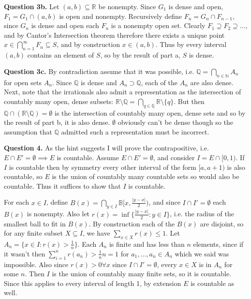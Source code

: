 \documentclass[letterpaper, reqno,11pt]{article}
\begin{document}
{\medskip\noindent\bf Question 3b.} Let $(a,b)\subseteq \mathbb{R}$ be nonempty. Since $G_1$ is dense and open, $F_1=G_1\cap (a,b)$ is open and nonempty. Recursively define $F_n=G_n\cap F_{n-1}$, since $G_n$ is dense and open each $F_n$ is a nonempty open set. Clearly $F_1\supseteq F_2\supseteq\ldots$, and by Cantor's Intersection theorem therefore there exists a unique point $x\in\bigcap_{n=1}^{\infty}F_n\subseteq S$, and by construction $x\in (a,b)$. Thus by every interval $(a,b)$ contains an element of $S$, so by the result of part a, $S$ is dense.

{\medskip\noindent\bf Question 3c.} By contradiction assume that it was possible, i.e. $\mathbb{Q}=\bigcap_{n\in \mathbb{N}}A_n$ for open sets $A_n$. Since $\mathbb{Q}$ is dense and $A_n\supset \mathbb{Q}$, each of the $A_n$ are also dense. Next, note that the irrationals also admit a representation as the intersection of countably many open, dense subsets: $\mathbb{R}\setminus \mathbb{Q}=\bigcap_{q\in \mathbb{Q}}\mathbb{R}\setminus \{q\}$. But then $\mathbb{Q}\cap (\mathbb{R}\setminus \mathbb{Q})=\emptyset$ is the intersection of countably many open, dense sets and so by the result of part b, it is also dense. $\emptyset$ obviously can't be dense though so the assumption that $\mathbb{Q}$ admitted such a representation must be incorrect.

\newpage\phantom{blabla}
\newpage

{\medskip\noindent\bf Question 4.} As the hint suggests I will prove the contrapositive, i.e. $E\cap E'=\emptyset\implies E$ is countable. Assume $E\cap E'=\emptyset$, and consider $I=E\cap [0,1)$. If $I$ is countable then by symmetry every other interval of the form $[a,a+1)$ is also countable, so $E$ is the union of countably many countable sets so would also be countable. Thus it suffices to show that $I$ is countable.

For each $x\in I$, define $B(x)=\bigcap_{y\in I}\mathbb B[x,\frac{|y-x|}{2})$, and since $I\cap I'=\emptyset$ each $B(x)$ is nonempty. Also let $r(x)=\inf \{\frac{|y-x|}{2}: y\in I\}$, i.e. the radius of the smallest ball to fit in $B(x)$. By construction each of the $B(x)$ are disjoint, so for any finite subset $X\subseteq I$, we have $\sum_{x\in X}r(x)\leq 1$. Let $A_n=\{x\in I: r(x)>\frac{1}{n}\}$. Each $A_n$ is finite and has less than $n$ elements, since if it wasn't then $\sum_{i=1}^{n}r(a_n)>\frac{1}{n}n=1$ for $a_1,\ldots,a_n\in A_n$ which we said was impossible. Also since $r(x)>0\forall x$ since $I\cap I'=\emptyset$, every $x\in X$ is in $A_n$ for some $n$. Then $I$ is the union of countably many finite sets, so it is countable. Since this applies to every interval of length 1, by extension $E$ is countable as well.
\end{document}
